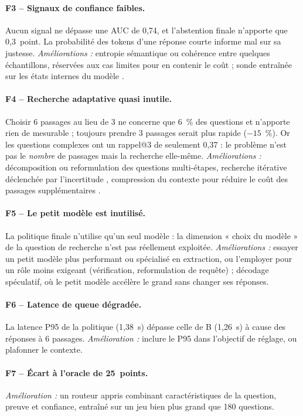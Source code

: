 \documentclass[11pt,a4paper]{article}
\begin{document}
\paragraph{F3 -- Signaux de confiance faibles.} Aucun signal ne dépasse une AUC de 0,74, et l'abstention
finale n'apporte que 0,3~point. La probabilité des tokens d'une réponse courte informe mal sur sa
justesse. \emph{Améliorations :} entropie sémantique \citep{kuhn2023semantic} ou cohérence entre
quelques échantillons, réservées aux cas limites pour en contenir le coût ; sonde entraînée sur les
états internes du modèle \citep{kadavath2022know}.

\paragraph{F4 -- Recherche adaptative quasi inutile.} Choisir 6 passages au lieu de 3 ne concerne que
6~\% des questions et n'apporte rien de mesurable ; toujours prendre 3 passages serait plus rapide
($-15$~\%). Or les questions complexes ont un rappel@3 de seulement 0,37 : le problème n'est pas le
\emph{nombre} de passages mais la recherche elle-même. \emph{Améliorations :} décomposition ou
reformulation des questions multi-étapes, recherche itérative déclenchée par l'incertitude
\citep{jiang2023flare,su2024dragin}, compression du contexte pour réduire le coût des passages
supplémentaires \citep{arefeen2024leancontext}.

\paragraph{F5 -- Le petit modèle est inutilisé.} La politique finale n'utilise qu'un seul modèle : la
dimension « choix du modèle » de la question de recherche n'est pas réellement exploitée.
\emph{Améliorations :} essayer un petit modèle plus performant ou spécialisé en extraction, ou l'employer
pour un rôle moins exigeant (vérification, reformulation de requête) ; décodage spéculatif, où le petit
modèle accélère le grand sans changer ses réponses.

\paragraph{F6 -- Latence de queue dégradée.} La latence P95 de la politique (1,38~s) dépasse celle de B
(1,26~s) à cause des réponses à 6 passages. \emph{Amélioration :} inclure le P95 dans l'objectif de
réglage, ou plafonner le contexte.

\paragraph{F7 -- Écart à l'oracle de 25~points.} \emph{Amélioration :} un routeur appris combinant
caractéristiques de la question, preuve et confiance, entraîné sur un jeu bien plus grand que
180 questions.
\end{document}
